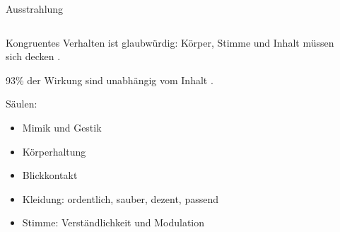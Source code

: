 \begin{frame}{Ausstrahlung}

  \begin{columns}[c]
    \begin{column}{0.55\textwidth}
      {\small

      Kongruentes Verhalten ist glaubwürdig: Körper, Stimme und Inhalt müssen sich decken \cite[][p. 161ff]{wannenwetsch_schluesselfaktoren_2009}.

      93\% der Wirkung sind unabhängig vom Inhalt \cite[][p. 164]{wannenwetsch_schluesselfaktoren_2009}.


        Säulen:
        \begin{itemize}
          \setlength\itemsep{0em}
          \item Mimik und Gestik 
          \item Körperhaltung
          \item Blickkontakt 
          \item Kleidung: ordentlich, sauber, dezent, passend 
          \item Stimme: Verständlichkeit und Modulation 
        \end{itemize}
      }
    \end{column}
    \begin{column}{0.35\textwidth}

\end{column}
\end{columns}
\end{frame}
